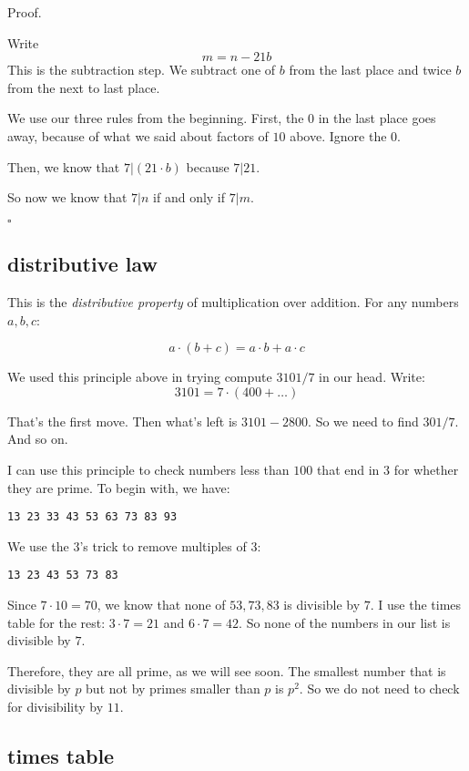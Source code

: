 \documentclass[11pt, oneside]{article}
\begin{document}
Proof.

Write
\[ m = n - 21b \]
This is the subtraction step.  We subtract one of $b$ from the last place and twice $b$ from the next to last place.  

We use our three rules from the beginning.  First, the $0$ in the last place goes away, because of what we said about factors of $10$ above.  Ignore the $0$.

Then, we know that $7|(21 \cdot b)$ because $7|21$.  

So now we know that $7|n$ if and only if $7|m$.

$\square$

\subsection*{distributive law}

This is the \emph{distributive property} of multiplication over addition.  For any numbers $a,b,c$:

\[ a \cdot (b+c) = a \cdot b + a \cdot c \]

We used this principle above in trying compute $3101/7$ in our head.  Write:
\[ 3101 = 7 \cdot (400 + \dots) \]

That's the first move.  Then what's left is $3101 - 2800$.  So we need to find $301/7$.  And so on.

I can use this principle to check numbers less than $100$ that end in $3$ for whether they are prime.  To begin with, we have:

\begin{verbatim}
13 23 33 43 53 63 73 83 93
\end{verbatim}

We use the $3$'s trick to remove multiples of $3$:

\begin{verbatim}
13 23 43 53 73 83
\end{verbatim}

Since $7 \cdot 10 = 70$, we know that none of $53, 73, 83$ is divisible by $7$.  I use the times table for the rest:  $3 \cdot 7 = 21$ and $6 \cdot 7 = 42$.  So none of the numbers in our list is divisible by $7$. 

Therefore, they are all prime, as we will see soon.  The smallest number that is divisible by $p$ but not by primes smaller than $p$ is $p^2$.  So we do not need to check for divisibility by $11$.

\subsection*{times table}
\end{document}
